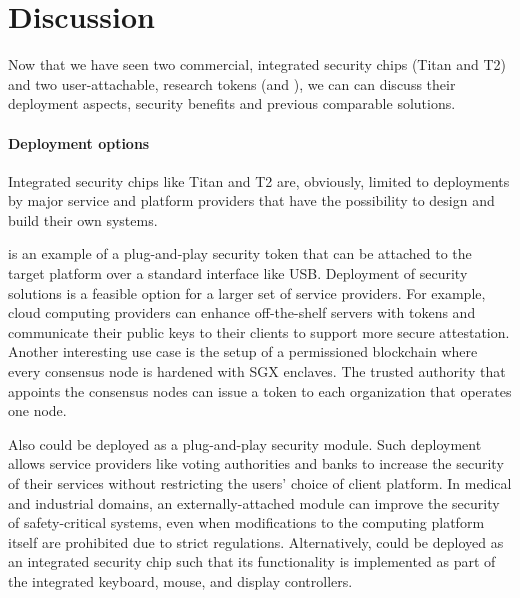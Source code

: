 
\section*{Discussion}

Now that we have seen two commercial, integrated security chips (Titan and T2) and two user-attachable, research tokens (\protection and \proximitee), we can can discuss their deployment aspects, security benefits and previous comparable solutions. 

\paragraph{Deployment options}
Integrated security chips like Titan and T2 are, obviously, limited to deployments by major service and platform providers that have the possibility to design and build their own systems. 

\proximitee is an example of a plug-and-play security token that can be attached to the target platform over a standard interface like USB. Deployment of security solutions is a feasible option for a larger set of service providers. For example, cloud computing providers can enhance off-the-shelf servers with \key tokens and communicate their public keys to their clients to support more secure attestation. Another interesting use case is the setup of a permissioned blockchain where every consensus node is hardened with SGX enclaves. The trusted authority that appoints the consensus nodes can issue a \key token to each organization that operates one node.

Also \protection could be deployed as a plug-and-play security module. Such deployment allows service providers like voting authorities and banks to increase the security of their services without restricting the users' choice of client platform. In medical and industrial domains, an externally-attached \protection module can improve the security of safety-critical systems, even when modifications to the computing platform itself are prohibited due to strict regulations. Alternatively, \protection could be deployed as an integrated security chip such that its functionality is implemented as part of the integrated keyboard, mouse, and display controllers. 


